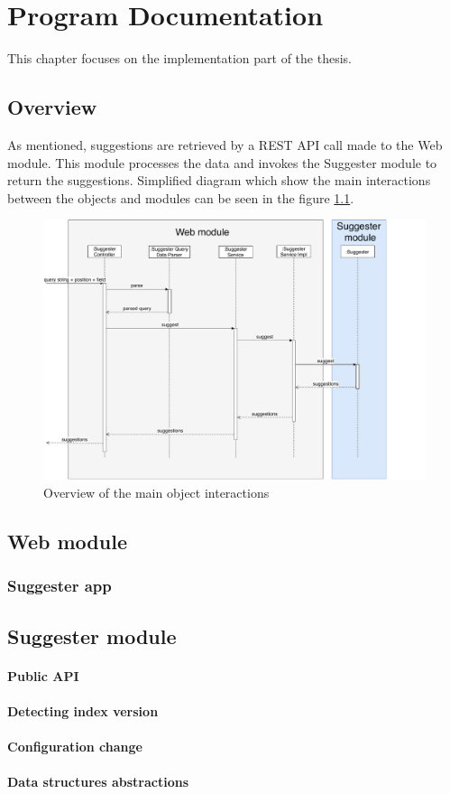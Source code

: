 \chapter{Program Documentation}
\label{chap:program}

This chapter focuses on the implementation part of the thesis.

\section{Overview}
As mentioned, suggestions are retrieved by a REST API call made to the Web module. This module processes the data and
invokes the Suggester module to return the suggestions. Simplified diagram which show the main interactions between the
objects and modules can be seen in the figure \ref{programmer_sequence}.
\begin{figure}[htbp]
    \centering
    \includegraphics[width=145mm]{../img/programmer_sequence.pdf}
    \caption{Overview of the main object interactions}
    \label{programmer_sequence}
\end{figure}

\section{Web module}

\subsection{Suggester app}

\section{Suggester module}

\subsubsection{Public API}

\subsubsection{Detecting index version}

\subsubsection{Configuration change}

\subsubsection{Data structures abstractions}

